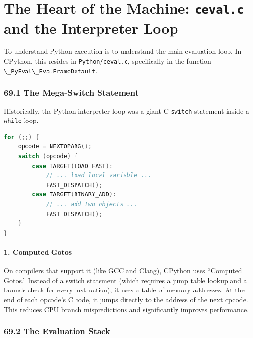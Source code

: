 \hypertarget{the-heart-of-the-machine-ceval.c-and-the-interpreter-loop}{%
\chapter{\texorpdfstring{The Heart of the Machine: \texttt{ceval.c} and
the Interpreter
Loop}{The Heart of the Machine: ceval.c and the Interpreter Loop}}\label{the-heart-of-the-machine-ceval.c-and-the-interpreter-loop}}

To understand Python execution is to understand the main evaluation
loop. In CPython, this resides in
\passthrough{\lstinline!Python/ceval.c!}, specifically in the function
\passthrough{\lstinline!\_PyEval\_EvalFrameDefault!}.

\hypertarget{the-mega-switch-statement}{%
\subsection{69.1 The Mega-Switch
Statement}\label{the-mega-switch-statement}}

Historically, the Python interpreter loop was a giant C
\passthrough{\lstinline!switch!} statement inside a
\passthrough{\lstinline!while!} loop.

\begin{lstlisting}[language=C]
for (;;) {
    opcode = NEXTOPARG();
    switch (opcode) {
        case TARGET(LOAD_FAST):
            // ... load local variable ...
            FAST_DISPATCH();
        case TARGET(BINARY_ADD):
            // ... add two objects ...
            FAST_DISPATCH();
    }
}
\end{lstlisting}

\hypertarget{computed-gotos}{%
\subsubsection{1. Computed Gotos}\label{computed-gotos}}

On compilers that support it (like GCC and Clang), CPython uses
``Computed Gotos.'' Instead of a switch statement (which requires a jump
table lookup and a bounds check for every instruction), it uses a table
of memory addresses. At the end of each opcode's C code, it jumps
directly to the address of the next opcode. This reduces CPU branch
mispredictions and significantly improves performance.

\hypertarget{the-evaluation-stack}{%
\subsection{69.2 The Evaluation Stack}\label{the-evaluation-stack}}

